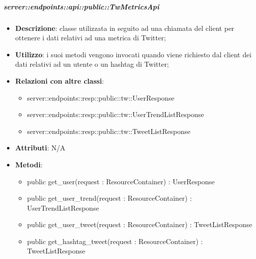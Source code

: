     \subparagraph{server::endpoints::api::public::TwMetricsApi} %
    \label{subp:bdsm_app_server_endpoints_api_public_twmetricsapi}
    \begin{itemize}
      \item \textbf{Descrizione}: classe utilizzata in seguito ad una chiamata del client per ottenere i dati relativi ad una metrica di Twitter;
      \item \textbf{Utilizzo}: i suoi metodi vengono invocati quando viene richiesto dal client dei dati relativi ad un utente o un hashtag di Twitter;
      \item \textbf{Relazioni con altre classi}:
        \begin{itemize}
          \item server::endpoints::resp::public::tw::UserResponse
          \item server::endpoints::resp::public::tw::UserTrendListResponse
          \item server::endpoints::resp::public::tw::TweetListResponse
        \end{itemize}
		\item \textbf{Attributi}: N/A
		\item \textbf{Metodi}:   
			\begin{itemize}
				\item public get\_user(request : ResourceContainer) : UserResponse
				\item public get\_user\_trend(request : ResourceContainer) : UserTrendListResponse
				\item public get\_user\_tweet(request : ResourceContainer) : TweetListResponse
				\item public get\_hashtag\_tweet(request : ResourceContainer) : TweetListResponse
			\end{itemize}
      \end{itemize}

